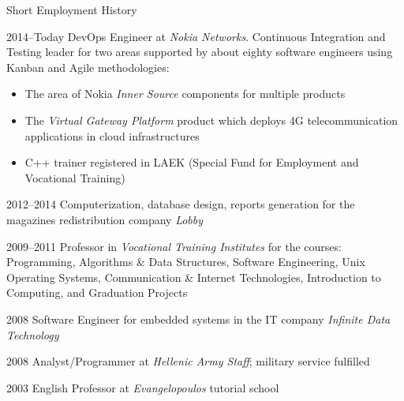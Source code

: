 \documentclass[a4paper]{article}
\begin{document}
\begin{cv}{}
\begin{cvlist}{Short Employment History}
  \item[2014--Today] \textsf{DevOps Engineer} at \emph{Nokia
                     Networks}. Continuous Integration and
                     Testing leader for two areas supported
                     by about eighty software engineers
                     using Kanban and Agile methodologies:
                     \begin{itemize}
                       \item The area of Nokia \emph{Inner
                             Source} components for multiple
                             products
                       \item The \emph{Virtual Gateway
                             Platform} product which deploys
                             4G telecommunication
                             applications in cloud
                             infrastructures
                       \item C++ trainer registered in LAEK
                             (Special Fund for Employment
                             and Vocational Training)
                     \end{itemize}
  \item[2012--2014] \textsf{Computerization}, database
                    design, reports generation for the
                    magazines redistribution company
                    \emph{Lobby}
  \item[2009--2011] \textsf{Professor} in \emph{Vocational
                    Training Institutes} for the courses:
                    Programming, Algorithms \& Data
                    Structures, Software Engineering, Unix
                    Operating Systems, Communication \&
                    Internet Technologies, Introduction to
                    Computing, and Graduation Projects
  \item[2008] \textsf{Software Engineer} for embedded
              systems in the IT company \emph{Infinite Data
              Technology}
  \item[2008] \textsf{Analyst/Programmer} at \emph{Hellenic
              Army Staff}; military service fulfilled
  \item[2003] \textsf{English Professor} at
              \emph{Evangelopoulos} tutorial school
\end{cvlist}


\end{cv}
\end{document}
